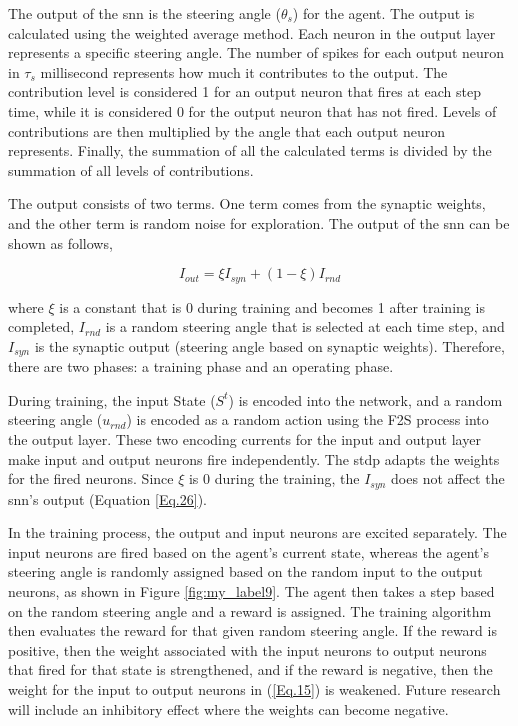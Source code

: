 The output of the \ac{snn} is the steering angle ($\theta_{s}$) for the agent. The output is calculated using the weighted average method. Each neuron in the output layer represents a specific steering angle. The number of spikes for each output neuron in $\tau_{s}$ millisecond represents how much it contributes to the output. The contribution level is considered 1 for an output neuron that fires at each step time, while it is considered 0 for the output neuron that has not fired. Levels of contributions are then multiplied by the angle that each output neuron represents. Finally, the summation of all the calculated terms is divided by the summation of all levels of contributions.

The output consists of two terms. One term comes from the synaptic weights, and the other term is random noise for exploration. The output of the \ac{snn} can be shown as follows,

\begin{equation} \label{Eq.26}
    I_{out} = \xi I_{syn} + \left(1 - \xi\right)I_{rnd}
\end{equation}

\noindent where $\xi$ is a constant that is 0 during training and becomes 1 after training is completed, $I_{rnd}$ is a random steering angle that is selected at each time step, and $I_{syn}$ is the synaptic output (steering angle based on synaptic weights). Therefore, there are two phases: a training phase and an operating phase.

During training, the input State ($S^t$) is encoded into the network, and a random steering angle ($u_{rnd}$) is encoded as a random action using the F2S process into the output layer. These two encoding currents for the input and output layer make input and output neurons fire independently. The \ac{stdp} adapts the weights for the fired neurons. Since $\xi$ is 0 during the training, the $I_{syn}$ does not affect the \ac{snn}'s output (Equation \ref{Eq.26}). 

In the training process, the output and input neurons are excited separately. The input neurons are fired based on the agent's current state, whereas the agent's steering angle is randomly assigned based on the random input to the output neurons, as shown in Figure \ref{fig:my_label9}. The agent then takes a step based on the random steering angle and a reward is assigned. The training algorithm then evaluates the reward for that given random steering angle. If the reward is positive, then the weight associated with the input neurons to output neurons that fired for that state is strengthened, and if the reward is negative, then the weight for the input to output neurons in (\ref{Eq.15}) is weakened. Future research will include an inhibitory effect where the weights can become negative.

